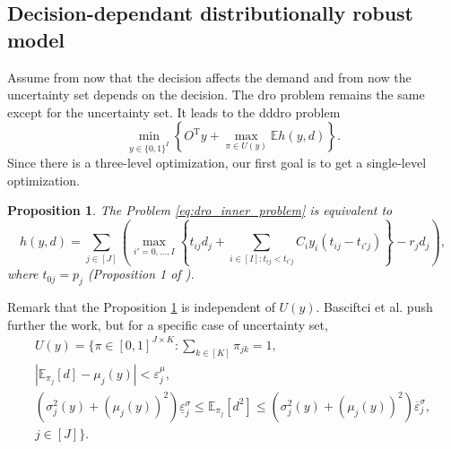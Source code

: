 \documentclass[12pt, letterpaper]{article}
\newcommand{\T}{\mathrm{T}}
\newcommand{\E}{\mathbb{E}}
\newtheorem{proposition}{Proposition}
\begin{document}
	\subsection{Decision-dependant distributionally robust model}
	Assume from now that the decision affects the demand and from now the uncertainty set depends on the decision. The \gls{dro} problem remains the same except for the uncertainty set. It leads to the \gls{dddro} problem 
	\begin{equation}\label{eq:dddro_outter_problem}
		\min_{y \in \{0, 1\}^I} \left\{O^\T y + \max_{\pi \in U(y)} \E h(y, d)\right\}.
	\end{equation}
	Since there is a three-level optimization, our first goal is to get a single-level optimization.
	
	\begin{proposition} \label{prop:duality_inner_problem}
		The Problem \eqref{eq:dro_inner_problem} is equivalent to
		\begin{equation} \label{eq:dro_equiv_inner_problem}
			h(y, d) = \sum_{j \in [J]} \left(\max_{i' = 0, \dots, I} \left\{t_{ij} d_j + \sum_{i \in [I]: t_{ij} < t_{i'j}} C_{i}y_{i}(t_{ij} - t_{i'j})\right\} - r_j d_j\right),
		\end{equation}
		where $t_{0j} = p_j$ (Proposition 1 of \cite{basciftci_distributionally_2021}).
	\end{proposition}
	
	Remark that the Proposition \ref{prop:duality_inner_problem} is independent of $U(y)$. Basciftci et al. push further the work, but for a specific case of uncertainty set,
	\begin{equation} \label{eq:def_dd_BAS_uncertainty_set}
		\begin{split}
			U(y) = \Bigg\{
				\pi \in [0, 1]^{J \times K} : \sum_{k \in [K]} \pi_{jk} = 1, \\
				\left|\E_{\pi_j}[d] - \mu_j(y)\right| < \varepsilon_j^\mu, \\
				\left(\sigma_j^2(y) + (\mu_j(y))^2\right)\underline{\varepsilon}_j^\sigma \le
				\E_{\pi_j}[d^2] \le \left(\sigma_j^2(y) + (\mu_j(y))^2\right)\overline{\varepsilon}_j^\sigma, \\
				j \in [J]
			\Bigg\}.
		\end{split}
	\end{equation}	
	
\end{document}
